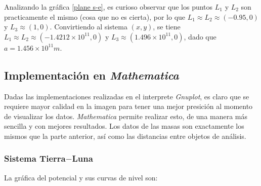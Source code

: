Analizando la gráfica \ref{plane s-e}, es curioso observar que los puntos $L_1$ y $L_2$ son practicamente el mismo (cosa que no es cierta), por lo que $L_1 \approx L_2 \approx (-0.95,0)$ y $L_3 \approx (1,0)$. Convirtiendo al sistema $(x,y)$, se tiene $L_1 \approx L_2 \approx (-1.4212\times 10^{11},0)$ y $L_3 \approx (1.496\times 10^{11},0)$, dado que $a = 1.456\times 10^{11}m$.




\subsection{Implementación en \textit{Mathematica}}

Dadas las implementaciones realizadas en el interprete \textit{Gnuplot}, es claro que se requiere mayor calidad en la imagen para tener una mejor presición al momento de visualizar los datos. \textit{Mathematica} permite realizar esto, de una manera más sencilla y con mejores resultados. Los datos de las masas son exactamente los mismos que la parte anterior, así como las distancias entre objetos de análisis.



\subsubsection{Sistema Tierra$-$Luna}
La gráfica del potencial y sus curvas de nivel son:

